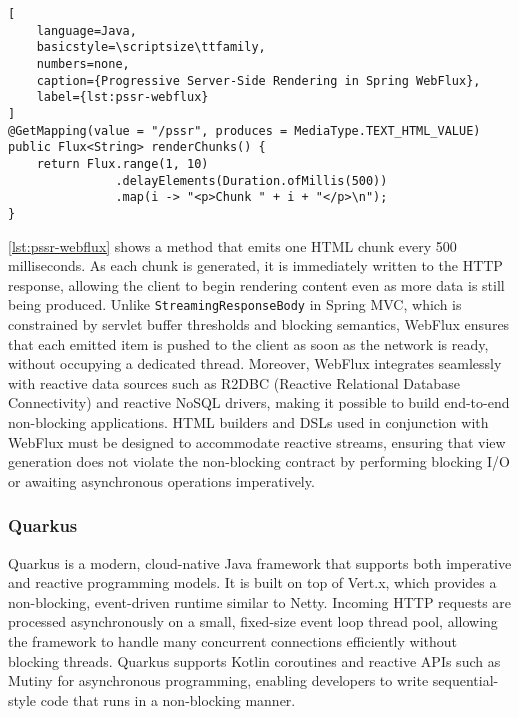 \begin{lstlisting}[
    language=Java,
    basicstyle=\scriptsize\ttfamily,
    numbers=none,
    caption={Progressive Server-Side Rendering in Spring WebFlux},
    label={lst:pssr-webflux}
]
@GetMapping(value = "/pssr", produces = MediaType.TEXT_HTML_VALUE)
public Flux<String> renderChunks() {
    return Flux.range(1, 10)
               .delayElements(Duration.ofMillis(500))
               .map(i -> "<p>Chunk " + i + "</p>\n");
}
\end{lstlisting}

\autoref{lst:pssr-webflux} shows a method that emits one HTML chunk every 500 milliseconds. As
each chunk is generated, it is immediately written to the HTTP response,
allowing the client to begin rendering content even as more data is still being
produced. Unlike \texttt{StreamingResponseBody} in Spring MVC, which is
constrained by servlet buffer thresholds and blocking semantics, WebFlux
ensures that each emitted item is pushed to the client as soon as the network
is ready, without occupying a dedicated thread. Moreover, WebFlux integrates
seamlessly with reactive data sources such as R2DBC (Reactive Relational
Database Connectivity) and reactive NoSQL drivers, making it possible to build
end-to-end non-blocking applications. HTML builders and DSLs used in
conjunction with WebFlux must be designed to accommodate reactive streams,
ensuring that view generation does not violate the non-blocking contract by
performing blocking I/O or awaiting asynchronous operations imperatively.

\subsubsection{Quarkus}

Quarkus is a modern, cloud-native Java framework that supports both imperative
and reactive programming models. It is built on top of Vert.x,
which provides a non-blocking, event-driven runtime similar to Netty. Incoming
HTTP requests are processed asynchronously on a small, fixed-size event loop
thread pool, allowing the framework to handle many concurrent connections
efficiently without blocking threads. Quarkus supports Kotlin coroutines and
reactive APIs such as Mutiny for asynchronous programming, enabling developers
to write sequential-style code that runs in a non-blocking manner.

